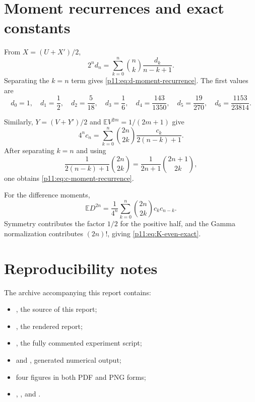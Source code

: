 \documentclass[11pt,oneside]{article}
\theoremstyle{definition}
\theoremstyle{remark}
\newcommand{\E}{\mathbb E}
\newcommand{\1}{\mathbf 1}
\begin{document}
\section{Moment recurrences and exact constants}
\label{p11:app:moments}

From $X=(U+X')/2$,
\begin{equation}
 2^nd_n=\sum_{k=0}^n\binom nk\frac{d_k}{n-k+1}.
\end{equation}
Separating the $k=n$ term gives \eqref{p11:eq:d-moment-recurrence}.  The first
values are
\begin{equation}
 d_0=1,
 \quad d_1=\frac12,
 \quad d_2=\frac5{18},
 \quad d_3=\frac16,
 \quad d_4=\frac{143}{1350},
 \quad d_5=\frac{19}{270},
 \quad d_6=\frac{1153}{23814}.
\end{equation}

Similarly, $Y=(V+Y')/2$ and $\E V^{2m}=1/(2m+1)$ give
\begin{equation}
 4^nc_n
 =\sum_{k=0}^n\binom{2n}{2k}
   \frac{c_k}{2(n-k)+1}.
\end{equation}
After separating $k=n$ and using
\begin{equation}
 \frac1{2(n-k)+1}\binom{2n}{2k}
 =\frac1{2n+1}\binom{2n+1}{2k},
\end{equation}
one obtains \eqref{p11:eq:c-moment-recurrence}.

For the difference moments,
\begin{equation}
 \E D^{2n}
 =\frac1{4^n}\sum_{k=0}^n
  \binom{2n}{2k}c_kc_{n-k}.
\end{equation}
Symmetry contributes the factor $1/2$ for the positive half, and the
Gamma normalization contributes $(2n)!$, giving
\eqref{p11:eq:K-even-exact}.

\section{Reproducibility notes}
\label{p11:app:reproducibility}

The archive accompanying this report contains:

\begin{itemize}
\item {}, the source of this
      report;
\item {}, the rendered
      report;
\item {}, the fully commented experiment
      script;
\item {} and
      , generated numerical output;
\item four figures in both PDF and PNG forms;
\item {}, , and
      .
\end{itemize}
\end{document}
